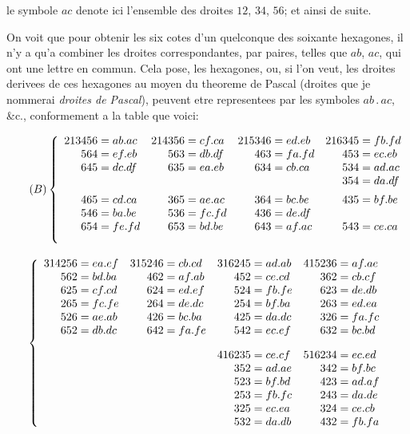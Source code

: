 \documentclass[11pt,a4paper]{book}
\begin{document}
le symbole $ac$ denote ici l'ensemble des droites $12$, $34$, $56$; et ainsi de suite.

On voit que pour obtenir les six cotes d'un quelconque des soixante hexagones, il n'y a qu'a combiner les droites correspondantes, par paires, telles que $ab$, $ac$, qui ont une lettre en commun. Cela pose, les hexagones, ou, si l'on veut, les droites derivees de ces hexagones au moyen du theoreme de Pascal (droites que je nommerai \textit{droites de Pascal}), peuvent etre representees par les symboles $ab\,.\,ac$, \&c., conformement a la table que voici:

\begin{equation}
\tag{$B$}
\left\{
\begin{array}{r@{\;=\;}l r@{\;=\;}l r@{\;=\;}l r@{\;=\;}l}
213456 & ab.ac & 214356 & cf.ca & 215346 & ed.eb & 216345 & fb.fd \\
564 & ef.eb & 563 & db.df & 463 & fa.fd & 453 & ec.eb \\
645 & dc.df & 635 & ea.eb & 634 & cb.ca & 534 & ad.ac \\
\multicolumn{6}{c}{} & 354 & da.df \\[0.5em]
465 & cd.ca & 365 & ae.ac & 364 & bc.be & 435 & bf.be \\
546 & ba.be & 536 & fc.fd & 436 & de.df & \multicolumn{2}{c}{} \\
654 & fe.fd & 653 & bd.be & 643 & af.ac & 543 & ce.ca \\[1em]
\end{array}
\right.
\end{equation}

\begin{equation}
\left\{
\begin{array}{r@{\;=\;}l r@{\;=\;}l r@{\;=\;}l r@{\;=\;}l}
314256 & ea.ef & 315246 & cb.cd & 316245 & ad.ab & 415236 & af.ae \\
562 & bd.ba & 462 & af.ab & 452 & ce.cd & 362 & cb.cf \\
625 & cf.cd & 624 & ed.ef & 524 & fb.fe & 623 & de.db \\
265 & fc.fe & 264 & de.dc & 254 & bf.ba & 263 & ed.ea \\
526 & ae.ab & 426 & bc.ba & 425 & da.dc & 326 & fa.fc \\
652 & db.dc & 642 & fa.fe & 542 & ec.ef & 632 & bc.bd \\[1em]
\multicolumn{4}{c}{} & 416235 & ce.cf & 516234 & ec.ed \\
\multicolumn{4}{c}{} & 352 & ad.ae & 342 & bf.bc \\
\multicolumn{4}{c}{} & 523 & bf.bd & 423 & ad.af \\
\multicolumn{4}{c}{} & 253 & fb.fc & 243 & da.de \\
\multicolumn{4}{c}{} & 325 & ec.ea & 324 & ce.cb \\
\multicolumn{4}{c}{} & 532 & da.db & 432 & fb.fa
\end{array}
\right.
\end{equation}
\end{document}
